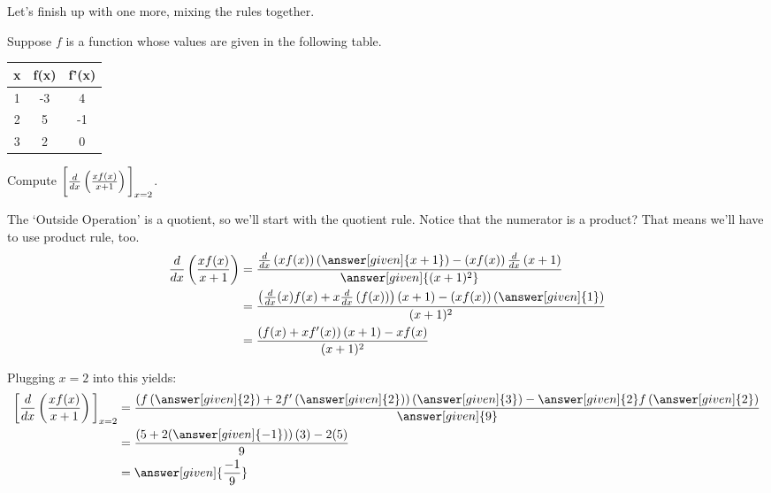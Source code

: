 \documentclass{ximera}
\begin{document}
Let's finish up with one more, mixing the rules together.
\begin{example}
	Suppose $f$ is a function whose values are given in the following table.
	\begin{center}
		\begin{tabular}{c c c}
			\hline \hline
			x & f(x) & f'(x) \\ 
			\hline
			1 & -3 & 4\\
			2 & 5 & -1\\
			3 & 2 & 0\\
			\hline
		\end{tabular}		
	\end{center}
		
	Compute $\bigg[  \frac{d}{\mathop{}\!d x}\left( \frac{x f(x)}{x+1} \right) \bigg]_{x=2}$.
	\begin{explanation}
	The `Outside Operation' is a quotient, so we'll start with the quotient rule.  Notice that the numerator is a product?  That means we'll have to use product rule, too.
	\begin{align*}
		\ddx\left( \frac{x f(x)}{x+1} \right) &= \frac{\ddx\left(x f(x)\right) \left(\answer[given]{x+1}\right) - \left( x f(x) \right) \ddx \left(x+1\right)}{\answer[given]{(x+1)^2}}\\
			&= \frac{\left( \ddx(x) f(x) + x\ddx\left(f(x)\right) \right) (x+1) - \left( x f(x) \right) \left( \answer[given]{1}\right)}{(x+1)^2}\\
			&= \frac{\left( f(x) + x f'(x) \right) (x+1) - x f(x)}{(x+1)^2}		
	\end{align*}
	
	Plugging $x=2$ into this yields:
	\begin{align*}
		\eval{ \ddx\left( \frac{x f(x)}{x+1} \right)}_{x=2} 
			&= \frac{\left( f\left(\answer[given]{2}\right) + 2 f'\left(\answer[given]{2}\right) \right) \left(\answer[given]{3}\right) - \answer[given]{2} f\left(\answer[given]{2}\right)}{\answer[given]{9}} \\
			&= \frac{\left( 5 + 2 (\answer[given]{-1})\right) (3) - 2 (5)}{9} \\
			&= \answer[given]{\frac{-1}{9}}
	\end{align*}
	\end{explanation}
\end{example}
\end{document}
